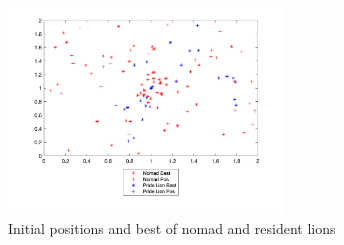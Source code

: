 \begin{figure}[h]
\begin{center}
\includegraphics[width=0.65\textwidth]{img/roam/roam-init}
\caption{Initial positions and best of nomad and resident lions}
\end{center}
\end{figure}

